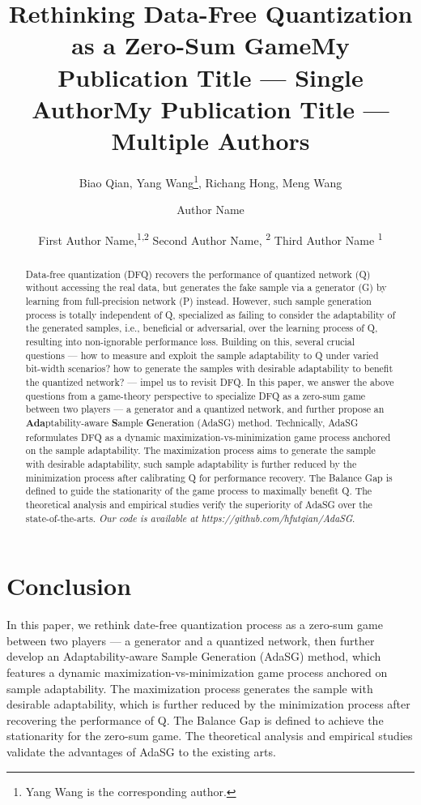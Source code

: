\documentclass[letterpaper]{article} %
\title{Rethinking Data-Free Quantization as a Zero-Sum Game}
\author{
    Biao Qian,
    Yang Wang\thanks{Yang Wang is the corresponding author.},
    Richang Hong,
    Meng Wang
}
\title{My Publication Title --- Single Author}
\author {
    Author Name
}
\title{My Publication Title --- Multiple Authors}
\author {
    First Author Name,\textsuperscript{\rm 1,\rm 2}
    Second Author Name, \textsuperscript{\rm 2}
    Third Author Name \textsuperscript{\rm 1}
}
\begin{document}
\maketitle

\begin{abstract}
Data-free quantization (DFQ) recovers the performance of quantized network (Q) without accessing the real data, but generates the fake sample via a generator (G) by learning from full-precision network (P) instead. However, such sample generation process is totally independent of Q, specialized as failing to consider the adaptability of the generated samples, i.e., beneficial or adversarial, over the learning process of Q, resulting into non-ignorable performance loss. Building on this, several crucial questions --- how to measure and exploit the sample adaptability to Q under varied bit-width scenarios? how to generate the samples with desirable adaptability to benefit the quantized network? --- impel us to revisit DFQ. In this paper, we answer the above questions from a game-theory perspective to specialize DFQ as a zero-sum game between two players --- a generator and a quantized network, and further propose an \textbf{Ada}ptability-aware \textbf{S}ample \textbf{G}eneration (AdaSG) method. Technically, AdaSG reformulates DFQ as a dynamic maximization-vs-minimization game process anchored on the sample adaptability. The maximization process aims to generate the sample with desirable adaptability, such sample adaptability is further reduced by the minimization process after calibrating Q for performance recovery. The Balance Gap is defined to guide the stationarity of the game process to maximally benefit Q. The theoretical analysis and empirical studies verify the superiority of AdaSG over the state-of-the-arts. \emph{Our code is available at https://github.com/hfutqian/AdaSG}.
\end{abstract}













\section{Conclusion}
In this paper, we rethink date-free quantization process as a zero-sum game between two players --- a generator and a quantized network, then further develop an Adaptability-aware Sample Generation (AdaSG) method, which features a dynamic maximization-vs-minimization game process anchored on sample adaptability. The maximization process generates the sample with desirable adaptability, which is further reduced by the minimization process after recovering the performance of Q. The Balance Gap is defined to achieve the stationarity for the zero-sum game. The theoretical analysis and empirical studies validate the advantages of AdaSG to the existing arts.
\end{document}
